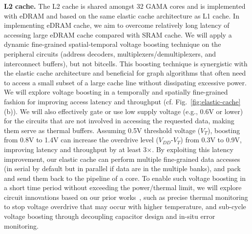 \noindent
\textbf{L2 cache.}
The L2 cache is shared amongst 32 GAMA cores and is implemented with eDRAM and based on the same elastic cache architecture as L1 cache. 
In implementing eDRAM cache, we aim to overcome relatively long latency of accessing large eDRAM cache compared with SRAM cache. 
We will apply a dynamic fine-grained spatial-temporal voltage boosting technique on the peripheral circuits (address decoders, multiplexers/demultiplexers, and interconnect buffers), but not bitcells. 
This boosting technique is synergistic with the elastic cache architecture and beneficial for graph algorithms that often need to access a small subset of a large cache line without dissipating excessive power. 
We will explore voltage boosting in a temporally and spatially fine-grained fashion for improving access latency and throughput (cf. Fig.~\ref{fig:elastic-cache}(b)). 
We will also effectively gate or use low supply voltage (e.g., 0.6V or lower) for the circuits that are not involved in accessing the requested data, making them serve as thermal buffers. 
Assuming 0.5V threshold voltage ($V_T$), 
boosting from 0.8V to 1.4V can increase the overdrive level ($V_{DD}$-$V_T$) from 0.3V to 0.9V, 
improving latency and throughput by at least 3$\times$. 
By exploiting this latency improvement, our elastic cache can perform multiple fine-grained data accesses (in serial by default but in parallel if data are in the multiple banks), and pack and send them back to the pipeline of a core. 
To enable such voltage boosting in a short time period without exceeding the power/thermal limit, 
we will explore circuit innovations based on our prior works~\cite{yang2015compact,  kim_vlsi16, Doyun2017}, such as precise thermal monitoring to stop voltage overdrive that may occur with higher temperature, and sub-cycle voltage boosting through decoupling capacitor design and in-situ error monitoring.


